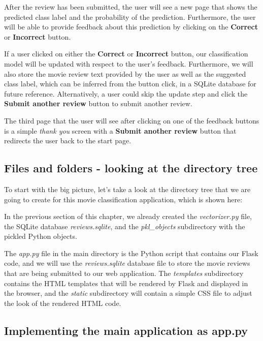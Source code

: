 \documentclass[11pt]{article}
\begin{document}
After the review has been submitted, the user will see a new page that
shows the predicted class label and the probability of the prediction.
Furthermore, the user will be able to provide feedback about this
prediction by clicking on the \textbf{Correct} or \textbf{Incorrect}
button.

If a user clicked on either the \textbf{Correct} or \textbf{Incorrect}
button, our classification model will be updated with respect to the
user's feedback. Furthermore, we will also store the movie review text
provided by the user as well as the suggested class label, which can be
inferred from the button click, in a SQLite database for future
reference. Alternatively, a user could skip the update step and click
the \textbf{Submit another review} button to submit another review.

The third page that the user will see after clicking on one of the
feedback buttons is a simple \emph{thank you} screen with a
\textbf{Submit another review} button that redirects the user back to
the start page.

    \subsection{Files and folders - looking at the directory
tree}\label{files-and-folders---looking-at-the-directory-tree}

    To start with the big picture, let's take a look at the directory tree
that we are going to create for this movie classification application,
which is shown here:

    In the previous section of this chapter, we already created the
\emph{vectorizer.py} file, the SQLite database \emph{reviews.sqlite},
and the \emph{pkl\_objects} subdirectory with the pickled Python
objects.

The \emph{app.py} file in the main directory is the Python script that
contains our Flask code, and we will use the \emph{reviews.sqlite}
database file to store the movie reviews that are being submitted to our
web application. The \emph{templates} subdirectory contains the HTML
templates that will be rendered by Flask and displayed in the browser,
and the \emph{static} subdirectory will contain a simple CSS file to
adjust the look of the rendered HTML code.

    \subsection{Implementing the main application as
app.py}\label{implementing-the-main-application-as-app.py}
\end{document}
